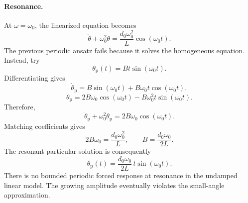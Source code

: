 \documentclass[12pt]{article}
\begin{document}
\paragraph{Resonance.}
At $\omega=\omega_0$, the linearized equation becomes
\[
\ddot{\theta}+\omega_0^2\theta
=\frac{d_0\omega_0^2}{L}\cos(\omega_0t).
\]
The previous periodic ansatz fails because it solves the homogeneous
equation. Instead, try
\[
\theta_{\mathrm{p}}(t)=Bt\sin(\omega_0t).
\]
Differentiating gives
\[
\dot{\theta}_{\mathrm{p}}
=B\sin(\omega_0t)+B\omega_0t\cos(\omega_0t),
\]
\[
\ddot{\theta}_{\mathrm{p}}
=2B\omega_0\cos(\omega_0t)
-B\omega_0^2t\sin(\omega_0t).
\]
Therefore,
\[
\ddot{\theta}_{\mathrm{p}}+\omega_0^2\theta_{\mathrm{p}}
=2B\omega_0\cos(\omega_0t).
\]
Matching coefficients gives
\[
2B\omega_0=\frac{d_0\omega_0^2}{L},
\qquad
B=\frac{d_0\omega_0}{2L}.
\]
The resonant particular solution is consequently
\[
\boxed{
\theta_{\mathrm{p}}(t)
=\frac{d_0\omega_0}{2L}\,t\sin(\omega_0t).
}
\]
There is no bounded periodic forced response at resonance in the
undamped linear model. The growing amplitude eventually violates
the small-angle approximation.
\end{document}
